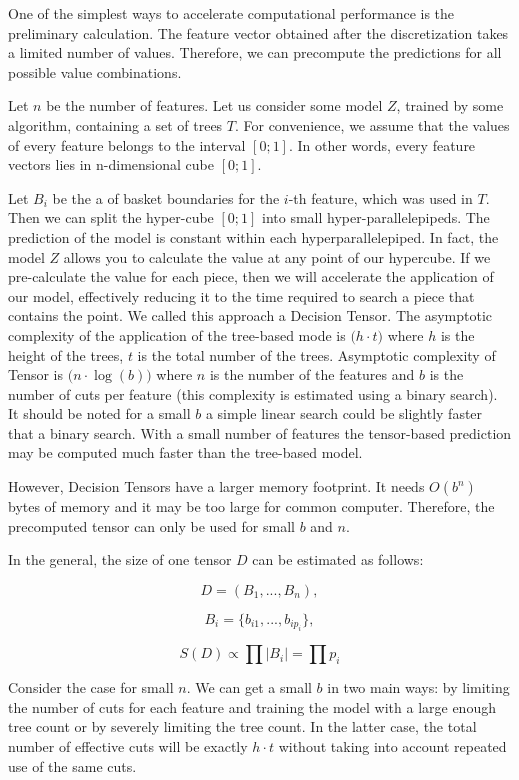 \documentclass[a4paper]{jpconf}
\begin{document}
One of the simplest ways to accelerate computational performance is the preliminary calculation. The feature vector obtained after the discretization takes a limited number of values. Therefore, we can precompute the predictions for all possible value combinations.

Let $n$ be the number of features. Let us consider some model $Z$, trained by some algorithm, containing a set of trees $T$. For convenience, we assume that the values of every feature belongs to the interval $[0;1]$. In other words, every feature vectors lies in n-dimensional cube $[0;1]$.

Let $B_i$ be the a of basket boundaries for the $i$-th feature, which was used in $T$. Then we can split the hyper-cube $[0;1]$ into small hyper-parallelepipeds. The prediction of the model is constant within each hyperparallelepiped. In fact, the model $Z$ allows you to calculate the value at any point of our hypercube. If we pre-calculate the value for each piece, then we will accelerate the application of our model, effectively reducing it to the time required to search a piece that contains the point. We called this approach a Decision Tensor. The asymptotic complexity of the application of the tree-based mode is $\mathcal(h\cdot t)$ where $h$ is the height of the trees, $t$ is the total number of the trees. Asymptotic complexity of Tensor is $\mathcal(n\cdot \log(b))$ where $n$ is the number of the features and $b$ is the number of cuts per feature (this complexity is estimated using a binary search). It should be noted for a small $b$ a simple linear search could be slightly faster that a binary search. With a small number of features the tensor-based prediction may be computed much faster than the tree-based model.

However, Decision Tensors have a larger memory footprint. It needs $O(b^n)$ bytes of memory and it may be too large for common computer. Therefore, the precomputed tensor can only be used for small $b$ and $n$.

In the general, the size of one tensor $D$ can be estimated as follows:

$$D = (B_{1}, ..., B_{n}),$$

$$B_{i} = \{b_{i1}, ..., b_{ip_{i}}\},$$

$$S(D) \propto \prod |B_{i}| = \prod p_i$$

Consider the case for small $n$. We can get a small $b$ in two main ways: by limiting the number of cuts for each feature and training the model with a large enough tree count or by severely limiting the tree count. In the latter case, the total number of effective cuts will be exactly $h\cdot t$ without taking into account repeated use of the same cuts.
\end{document}
